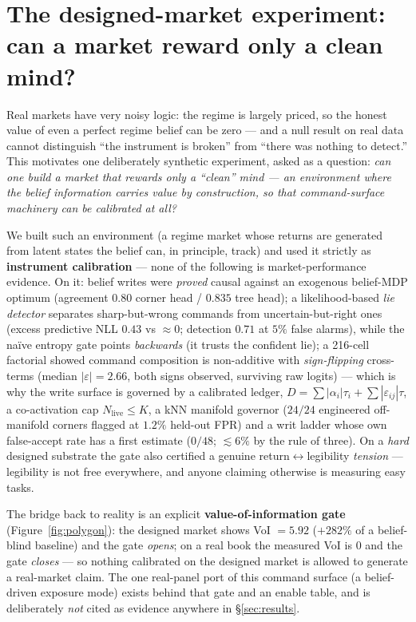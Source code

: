 \documentclass[11pt]{article}
\begin{document}
\section{The designed-market experiment: can a market reward only a clean mind?}
\label{sec:polygon}

Real markets have very noisy logic: the regime is largely priced, so the honest value of even a
perfect regime belief can be zero --- and a null result on real data cannot distinguish ``the
instrument is broken'' from ``there was nothing to detect.'' This motivates one deliberately
synthetic experiment, asked as a question: \emph{can one build a market that rewards only a
``clean'' mind --- an environment where the belief information carries value by construction,
so that command-surface machinery can be calibrated at all?}

We built such an environment (a regime market whose returns are generated from latent states
the belief can, in principle, track) and used it strictly as \textbf{instrument calibration} ---
none of the following is market-performance evidence. On it: belief writes were \emph{proved}
causal against an exogenous belief-MDP optimum (agreement $0.80$ corner head / $0.835$
tree head); a likelihood-based \emph{lie detector} separates sharp-but-wrong commands from
uncertain-but-right ones (excess predictive NLL $0.43$ vs ${\approx}0$; detection $0.71$ at
$5\%$ false alarms), while the na\"ive entropy gate points \emph{backwards} (it trusts the
confident lie); a 216-cell factorial showed command composition is non-additive with
\emph{sign-flipping} cross-terms (median $|\varepsilon| = 2.66$, both signs observed, surviving
raw logits) --- which is why the write surface is governed by a calibrated ledger,
$D = \sum{|\alpha_i|\tau_i} + \sum{|\varepsilon_{ij}|\tau}$, a co-activation cap
$N_{\text{live}} \le K$, a kNN manifold governor ($24/24$ engineered off-manifold corners
flagged at $1.2\%$ held-out FPR) and a writ ladder whose own false-accept rate has a first
estimate ($0/48$; $\lesssim 6\%$ by the rule of three). On a \emph{hard} designed substrate the
gate also certified a genuine return$\leftrightarrow$legibility \emph{tension} --- legibility
is not free everywhere, and anyone claiming otherwise is measuring easy tasks.

The bridge back to reality is an explicit \textbf{value-of-information gate}
(Figure~\ref{fig:polygon}): the designed market shows VoI $= 5.92$ ($+282\%$ of a belief-blind
baseline) and the gate \emph{opens}; on a real book the measured VoI is $0$ and the gate
\emph{closes} --- so nothing calibrated on the designed market is allowed to generate a
real-market claim. The one real-panel port of this command surface (a belief-driven exposure
mode) exists behind that gate and an enable table, and is deliberately \emph{not} cited as
evidence anywhere in \S\ref{sec:results}.
\end{document}
